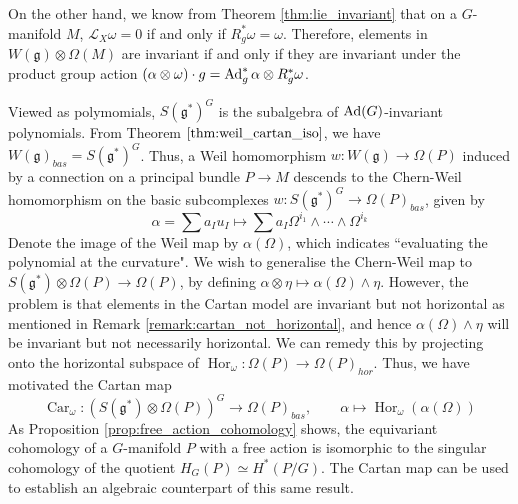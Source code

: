 On the other hand, we know from Theorem \ref{thm:lie_invariant} that 
on a $G$-manifold  $M$,  $\mathcal{L}_X \omega = 0$ if and only if $R_g^*\omega
= \omega$. Therefore, elements in $W(\mathfrak{g})\otimes \Omega(M)$ are
invariant if and only if they are invariant under the product group action
$(\alpha\otimes \omega) \cdot g = \operatorname{Ad}_g^*\alpha \otimes R_g^*\omega$.

Viewed as polymomials, $S(\mathfrak{g}^*)^G$ is the subalgebra of 
$\operatorname{Ad}(G)$-invariant polynomials.
From Theorem $\ref{thm:weil_cartan_iso}$, we have
$W(\mathfrak{g})_{bas} = S(\mathfrak{g}^*)^G$. Thus, a Weil homomorphism 
$w: W(\mathfrak{g}) \to \Omega(P)$ induced by a connection on a principal bundle 
$P\to M$ descends to 
the Chern-Weil homomorphism on the basic subcomplexes
$w : S(\mathfrak{g}^*)^G \to \Omega(P)_{bas}$, given by  
\[
\alpha=\sum a_I u_I \mapsto \sum a_I \Omega^{i_1}\wedge \cdots\wedge\Omega^{i_k}
\] 
Denote the image of the Weil map by $\alpha(\Omega)$, which indicates ``evaluating 
the polynomial at the curvature". 
We wish to generalise the Chern-Weil map to 
$S(\mathfrak{g}^*)\otimes \Omega(P)\to \Omega(P)$, by defining $\alpha\otimes \eta \mapsto
\alpha(\Omega)\wedge \eta$.  However, the problem is that elements in the Cartan model
are invariant but not horizontal as mentioned in Remark
\ref{remark:cartan_not_horizontal}, and hence $\alpha(\Omega) \wedge \eta$ will be
invariant but not necessarily horizontal. We can remedy this by 
projecting onto the horizontal subspace of
$\operatorname{Hor}_{\omega}:\Omega(P)\to \Omega(P)_{hor}$. Thus, we have
motivated the Cartan map  
\begin{equation}
	\operatorname{Car}_{\omega} : (S(\mathfrak{g}^*)\otimes\Omega(P))^G\to \Omega(P)_{bas},
	\qquad \alpha \mapsto \operatorname{Hor}_{\omega}(\alpha(\Omega))
\end{equation}
As Proposition \ref{prop:free_action_cohomology} shows, the equivariant 
cohomology of a $G$-manifold  $P$ with a
free action is isomorphic to the singular cohomology of the quotient
$H_G(P)\simeq H^*(P /G)$. The Cartan map can be used to establish an algebraic
counterpart of this same result. 
